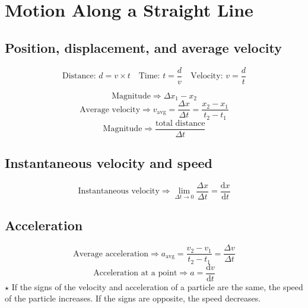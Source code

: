 \section{Motion Along a Straight Line}

\subsection{Position, displacement, and average velocity}
\[
\text{Distance: } d = v \times t \quad
\text{Time: } t = \frac{d}{v} \quad
\text{Velocity: } v = \frac{d}{t}
\]

\begin{equation*}
    \textrm{Magnitude} \Rightarrow \Delta x_1 - x_2
\end{equation*}
\begin{equation*}
    \textrm{Average velocity} \Rightarrow v_\textrm{avg} = \frac{\Delta x}{\Delta t} = \frac{x_2 - x_1}{t_2 - t_1}
\end{equation*}
\begin{equation*}
    \textrm{Magnitude} \Rightarrow \frac{\textrm{total distance}}{\Delta t}
\end{equation*}

\subsection{Instantaneous velocity and speed}

\begin{equation*}
    \textrm{Instantaneous velocity} \Rightarrow \lim_{\Delta t \to 0} \frac{\Delta x}{\Delta t} = \frac{\mathrm{d}x}{\mathrm{d}t}
\end{equation*}

\subsection{Acceleration}
\begin{equation*}
    \textrm{Average acceleration} \Rightarrow a_{\text{avg}} = \frac{v_2 - v_1}{t_2 - t_1} = \frac{\Delta v}{\Delta t}
\end{equation*}
\begin{equation*}
    \textrm{Acceleration at a point} \Rightarrow a = \frac{\mathrm{d}v}{\mathrm{d}t}
\end{equation*}
\noindent $\star$ If the signs of the velocity and acceleration of a particle are the same, the speed
of the particle increases. If the signs are opposite, the speed decreases.

